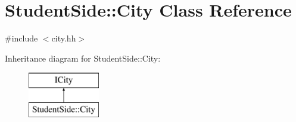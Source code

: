 \hypertarget{class_student_side_1_1_city}{\section{Student\-Side\-:\-:City Class Reference}
\label{class_student_side_1_1_city}
}


{\ttfamily \#include $<$city.\-hh$>$}

Inheritance diagram for Student\-Side\-:\-:City\-:\begin{figure}[H]
\begin{center}
\leavevmode
\includegraphics[height=2.000000cm]{class_student_side_1_1_city}
\end{center}
\end{figure}
